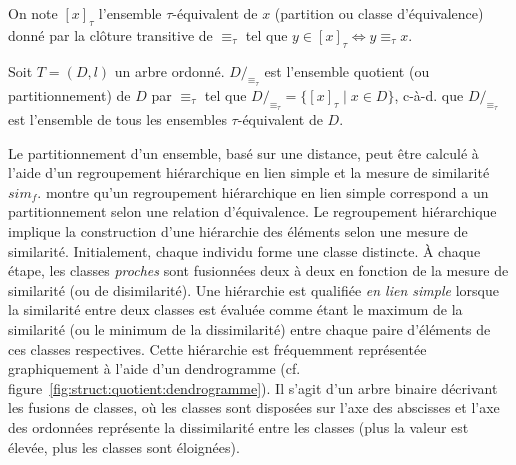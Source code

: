 
\begin{definition}
    On note $[x]_\tau$ l'ensemble $\tau$-équivalent de $x$ (partition ou classe d'équivalence) donné par la clôture transitive de $\equiv_\tau$ tel que $y \in [x]_\tau \iff y \equiv_\tau x$.

    Soit $T = (D, l)$ un arbre ordonné.
    $D/_{\equiv_\tau}$ est l'ensemble quotient (ou partitionnement) de $D$ par $\equiv_\tau$ tel que $D/_{\equiv_\tau} = \{[x]_\tau \mid x \in D\}$, c-à-d. que $D/_{\equiv_\tau}$ est l'ensemble de tous les ensembles $\tau$-équivalent de $D$.
\end{definition}

Le partitionnement d'un ensemble, basé sur une distance, peut être calculé à l'aide d'un regroupement hiérarchique en lien simple et la mesure de similarité $sim_f$.
\cite{carlssonCharacterizationStabilityConvergence2010} montre qu'un regroupement hiérarchique en lien simple correspond a un partitionnement selon une relation d'équivalence.
Le regroupement hiérarchique implique la construction d'une hiérarchie des éléments selon une mesure de similarité.
Initialement, chaque individu forme une classe distincte.
À chaque étape, les classes \emph{proches} sont fusionnées deux à deux en fonction de la mesure de similarité (ou de disimilarité).
Une hiérarchie est qualifiée \emph{en lien simple} lorsque la similarité entre deux classes est évaluée comme étant le maximum de la similarité (ou le minimum de la dissimilarité) entre chaque paire d'éléments de ces classes respectives.
Cette hiérarchie est fréquemment représentée graphiquement à l'aide d'un dendrogramme (cf. figure~\ref{fig:struct:quotient:dendrogramme}).
Il s'agit d'un arbre binaire décrivant les fusions de classes, où les classes sont disposées sur l'axe des abscisses et l'axe des ordonnées représente la dissimilarité entre les classes (plus la valeur est élevée, plus les classes sont éloignées).

